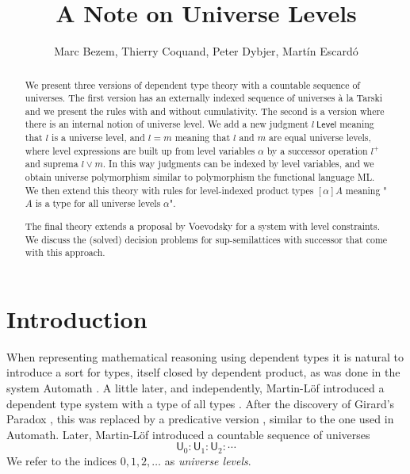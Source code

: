 \documentclass[11pt,a4paper]{article}
\def\UU{\mathsf{U}}
\def\Level{\mathsf{Level}}
\begin{document}
\title{A Note on Universe Levels}

\author{Marc Bezem, Thierry Coquand, Peter Dybjer, Mart\'in Escard\'o}
\date{}
\maketitle

\begin{abstract}
  We present three versions of dependent type theory with a countable sequence of universes.
  The first version has an externally indexed sequence of universes \`a la Tarski and we present the rules with and without cumulativity.
  The second is a version where there is an internal notion of universe level. We add a new judgment $l\ \Level$ meaning that $l$ is a universe level, and $l = m$ meaning that $l$ and $m$ are equal universe levels, where level expressions are built up from level variables $\alpha$ by a successor operation $l^+$ and suprema $l \vee m$. In this way judgments can be indexed by level variables, and we obtain universe polymorphism similar to polymorphism the functional language ML. 
  We then extend this theory with rules for level-indexed product types $[\alpha]A$ meaning "$A$ is a type for all universe levels $\alpha$".

  The final theory extends a proposal by Voevodsky
  for a system with level constraints. We discuss the (solved) decision problems for sup-semilattices with 
successor that come with this approach. 
\end{abstract}


\section{Introduction}\label{sec:intros}

When representing mathematical reasoning using dependent types it is natural to introduce
a sort for types, itself closed by dependent product, as was done in the system Automath \cite{deBruijn68}.
A little later, and independently, Martin-Löf introduced a dependent type system with
a type of all types \cite{ML71}.
After the discovery of Girard's Paradox \cite{Girard71}, this was replaced by a predicative
version \cite{ML72}, similar to the one used in Automath. Later, 
Martin-L\"of introduced a countable sequence of universes  \cite{martinlof:predicative}
$$
\UU_0 : \UU_1 : \UU_2 : \cdots
$$
We refer to the indices $0, 1, 2, \ldots$ as {\em universe levels}.
\end{document}
